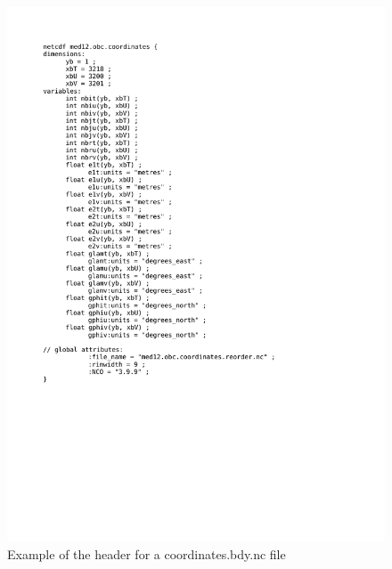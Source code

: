 \begin{figure}[!t]     \begin{center}
\includegraphics[width=1.0\textwidth]{./TexFiles/Figures/Fig_LBC_nc_header.pdf}
\caption {     \label{Fig_LBC_nc_header} 
Example of the header for a coordinates.bdy.nc file}
\end{center}   \end{figure}




